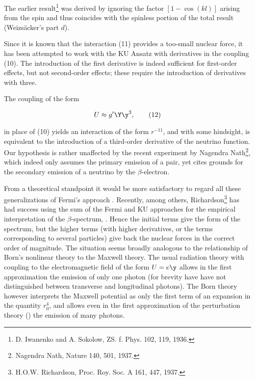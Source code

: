 \documentclass{article}
\newcommand{\nequ}[2]{
\begin{align*}
#1
\tag{#2}
\end{align*}
}
\begin{document}
The earlier result\footnote{D. Iwanenko and A. Sokolow, ZS. f. Phys. 102, 119, 1936.} was derived by ignoring the factor $[1-\cos{(kl)}]$ arising from the spin and thus coincides with the spinless portion of the total result (Weizs\"acker's part $d$).

Since it is known that the interaction (11) provides a too-small nuclear force, it has been attempted to work with the KU Ansatz with derivatives in the coupling (10). The introduction of the first derivative is indeed sufficient for first-order effects, but not second-order effects; these require the introduction of derivatives with  three. 

The coupling of the form
\nequ{
U\approx g'\Y\y^3,
}{12}
in place of (10) yields an interaction of the form $r^{-11}$, and with some hindsight, is equivalent to the introduction of a third-order derivative of the neutrino function. Our hypothesis is rather unaffected by the recent experiment by Nagendra Nath\footnote{Nagendra Nath, Nature 140, 501, 1937.}, which indeed only assumes the primary emission of a pair, yet cites grounds for the secondary  emission of a neutrino by the $\beta$-electron.

From a theoretical standpoint it would be more satisfactory to regard all these generalizations of Fermi's approach . Recently, among others, Richardson\footnote{H.O.W. Richardson, Proc. Roy. Soc. A 161, 447, 1937.} has had success using the sum of the Fermi and KU approaches for the empirical interpretation of the $\beta$-spectrum, . Hence the initial terms give the form of the spectrum, but the higher terms (with higher derivatives, or the terms corresponding to several particles) give back the nuclear forces in the correct order of magnitude. The situation seems broadly analogous to the relationship of Born's nonlinear theory to the Maxwell theory. The usual radiation theory with coupling to the electromagnetic field of the form $U=e\y$ allows in the first approximation the emission of only one photon (for brevity have have not distinguished between transverse and longitudinal photons). The Born theory however interprets the Maxwell potential as only the first term of an expansion in the quantity $r_0^4$, and allows even in the first approximation of the perturbation theory () the emission of many photons.
\end{document}
